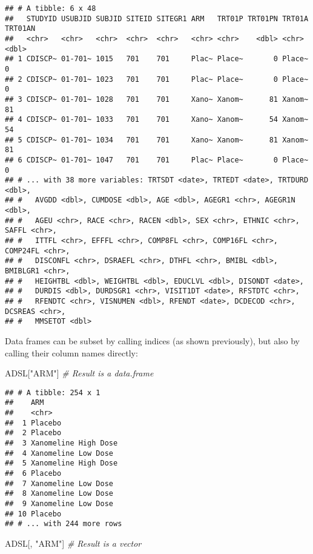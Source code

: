 \documentclass[]{book}
\newenvironment{Shaded}{\begin{snugshade}}{\end{snugshade}}
\newcommand{\CommentTok}[1]{\textcolor[rgb]{0.56,0.35,0.01}{\textit{#1}}}
\newcommand{\NormalTok}[1]{#1}
\newcommand{\StringTok}[1]{\textcolor[rgb]{0.31,0.60,0.02}{#1}}
\begin{document}
\begin{verbatim}
## # A tibble: 6 x 48
##   STUDYID USUBJID SUBJID SITEID SITEGR1 ARM   TRT01P TRT01PN TRT01A TRT01AN
##   <chr>   <chr>   <chr>  <chr>  <chr>   <chr> <chr>    <dbl> <chr>    <dbl>
## 1 CDISCP~ 01-701~ 1015   701    701     Plac~ Place~       0 Place~       0
## 2 CDISCP~ 01-701~ 1023   701    701     Plac~ Place~       0 Place~       0
## 3 CDISCP~ 01-701~ 1028   701    701     Xano~ Xanom~      81 Xanom~      81
## 4 CDISCP~ 01-701~ 1033   701    701     Xano~ Xanom~      54 Xanom~      54
## 5 CDISCP~ 01-701~ 1034   701    701     Xano~ Xanom~      81 Xanom~      81
## 6 CDISCP~ 01-701~ 1047   701    701     Plac~ Place~       0 Place~       0
## # ... with 38 more variables: TRTSDT <date>, TRTEDT <date>, TRTDURD <dbl>,
## #   AVGDD <dbl>, CUMDOSE <dbl>, AGE <dbl>, AGEGR1 <chr>, AGEGR1N <dbl>,
## #   AGEU <chr>, RACE <chr>, RACEN <dbl>, SEX <chr>, ETHNIC <chr>, SAFFL <chr>,
## #   ITTFL <chr>, EFFFL <chr>, COMP8FL <chr>, COMP16FL <chr>, COMP24FL <chr>,
## #   DISCONFL <chr>, DSRAEFL <chr>, DTHFL <chr>, BMIBL <dbl>, BMIBLGR1 <chr>,
## #   HEIGHTBL <dbl>, WEIGHTBL <dbl>, EDUCLVL <dbl>, DISONDT <date>,
## #   DURDIS <dbl>, DURDSGR1 <chr>, VISIT1DT <date>, RFSTDTC <chr>,
## #   RFENDTC <chr>, VISNUMEN <dbl>, RFENDT <date>, DCDECOD <chr>, DCSREAS <chr>,
## #   MMSETOT <dbl>
\end{verbatim}

Data frames can be subset by calling indices (as shown previously), but also by calling their column names directly:

\begin{Shaded}
\begin{Highlighting}[]
\NormalTok{ADSL[}\StringTok{"ARM"}\NormalTok{]       }\CommentTok{# Result is a data.frame}
\end{Highlighting}
\end{Shaded}

\begin{verbatim}
## # A tibble: 254 x 1
##    ARM                 
##    <chr>               
##  1 Placebo             
##  2 Placebo             
##  3 Xanomeline High Dose
##  4 Xanomeline Low Dose 
##  5 Xanomeline High Dose
##  6 Placebo             
##  7 Xanomeline Low Dose 
##  8 Xanomeline Low Dose 
##  9 Xanomeline Low Dose 
## 10 Placebo             
## # ... with 244 more rows
\end{verbatim}

\begin{Shaded}
\begin{Highlighting}[]
\NormalTok{ADSL[, }\StringTok{"ARM"}\NormalTok{]     }\CommentTok{# Result is a vector}
\end{Highlighting}
\end{Shaded}
\end{document}

